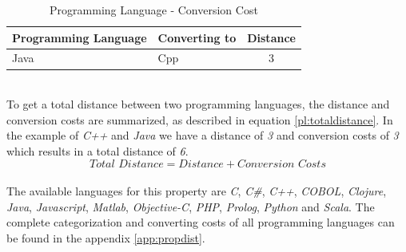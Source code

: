 \begin{table}[h]
	\centering 
	\setlength{\tabcolsep}{4pt}
	\begin{tabular}{|l|l|c|}\hline
		Programming Language	& Converting to &  Distance 	\\ \hline
		Java   				& Cpp		& 3      		\\ \hline
	\end{tabular} 
	\caption{Programming Language - Conversion Cost} 
	\label{property:proglangconversion} 
\end{table}\\
To get a total distance between two programming languages, the distance and conversion costs are summarized, as described in equation \ref{pl:totaldistance}. In the example of \textit{C++} and \textit{Java} we have a distance of \textit{3} and conversion costs of \textit{3} which results in a total distance of \textit{6}.
\begin{equation}
\textit{Total Distance} = \textit{Distance} + \textit{Conversion Costs}\label{pl:totaldistance}
\end{equation}\\
The available languages for this property are \textit{C}, \textit{C\#}, \textit{C++}, \textit{COBOL}, \textit{Clojure}, \textit{Java}, \textit{Javascript}, \textit{Matlab}, \textit{Objective-C},\textit{ PHP}, \textit{Prolog}, \textit{Python} and \textit{Scala}. The complete categorization and converting costs of all programming languages can be found in the appendix \ref{app:propdist}.

